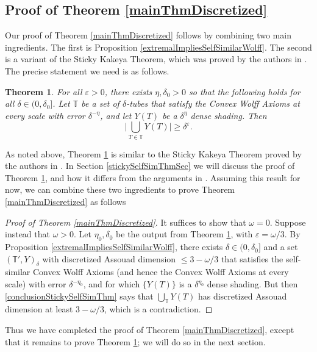 \documentclass[letterpaper, reqno,11pt]{article}
\numberwithin{equation}{section}
\newcommand{\eps}{\varepsilon}
\newcommand{\tubes}{\mathbb{T}}
\newtheorem{thm}{Theorem}
\numberwithin{thm}{section}
\theoremstyle{remark}
\begin{document}
\subsection{Proof of Theorem \ref{mainThmDiscretized}}
Our proof of Theorem \ref{mainThmDiscretized} follows by combining two main ingredients. The first is Proposition \ref{extremalImpliesSelfSimilarWolff}. The second is a variant of the Sticky Kakeya Theorem, which was proved by the authors in \cite{WZ}. The precise statement we need is as follows. 


\begin{thm}\label{stickySelfSimThm}
For all $\eps>0$, there exists $\eta,\delta_0>0$ so that the following holds for all $\delta\in(0,\delta_0]$. Let $\tubes$ be a set of $\delta$-tubes that satisfy the Convex Wolff Axioms at every scale with error $\delta^{-\eta}$, and let $Y(T)$ be a $\delta^{\eta}$ dense shading. Then
\begin{equation}\label{conclusionStickySelfSimThm}
\Big|\bigcup_{T\in\tubes}Y(T)\Big|\geq\delta^\eps.
\end{equation}
\end{thm}

As noted above, Theorem \ref{stickySelfSimThm} is similar to the Sticky Kakeya Theorem proved by the authors in \cite{WZ}. In Section \ref{stickySelfSimThmSec} we will discuss the proof of Theorem \ref{stickySelfSimThm}, and how it differs from the arguments in \cite{WZ}. Assuming this result for now, we can combine these two ingredients to prove Theorem \ref{mainThmDiscretized} as follows

\begin{proof}[Proof of Theorem \ref{mainThmDiscretized}]
It suffices to show that $\omega=0$. Suppose instead that $\omega>0$. Let $\eta_0,\delta_0$ be the output from Theorem \ref{stickySelfSimThm}, with $\eps=\omega/3$. By Proposition \ref{extremalImpliesSelfSimilarWolff}, there exists $\delta\in(0,\delta_0]$ and a set $(\tubes',Y)_\delta$ with discretized Assouad dimension $\leq 3-\omega/3$ that satisfies the self-similar Convex Wolff Axioms (and hence the Convex Wolff Axioms at every scale) with error $\delta^{-\eta_0}$, and for which $\{Y(T)\}$ is a $\delta^{\eta_0}$ dense shading. But then \eqref{conclusionStickySelfSimThm} says that $\bigcup_\tubes Y(T)$ has discretized Assouad dimension at least $3-\omega/3$, which is a contradiction. 
\end{proof}
Thus we have completed the proof of Theorem \ref{mainThmDiscretized}, except that it remains to prove Theorem \ref{stickySelfSimThm}; we will do so in the next section. 
\end{document}

